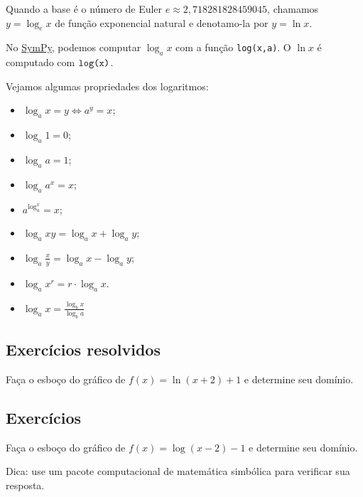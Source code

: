 \begin{obs}
  Quando a base é o número de Euler $e \approx 2,718281828459045$, chamamos $y = \log_e x$ de função exponencial natural e denotamo-la por $y = \ln x$.

  \ifispython
  No \href{https://www.sympy.org}{SymPy}, podemos computar $\log_a x$ com a função \verb+log(x,a)+. O $\ln x$ é computado com $\verb+log(x)+$.
  \fi
\end{obs}

\begin{obs}
  Vejamos algumas propriedades dos logaritmos:
  \begin{itemize}
  \item $\displaystyle \log_a x = y \Leftrightarrow a^y = x$;
  \item $\displaystyle \log_a 1 = 0$;
  \item $\displaystyle \log_a a = 1$;
  \item $\displaystyle \log_a a^x = x$;
  \item $\displaystyle a^{\log_a^x} = x$;
  \item $\displaystyle \log_a xy = \log_a x + \log_a y$;
  \item $\displaystyle \log_a \frac{x}{y} = \log_a x - \log_a y$;
  \item $\displaystyle \log_a x^r = r\cdot\log_a x$.
  \item $\displaystyle \log_a x = \frac{\log_b x}{\log_b a}$
  \end{itemize}
\end{obs}

\subsection*{Exercícios resolvidos}

\begin{exeresol}
  Faça o esboço do gráfico de $f(x) = \ln(x+2)+1$ e determine seu domínio.
\end{exeresol}
\begin{resol}
  \emconstrucao
\end{resol}

\subsection*{Exercícios}

\begin{exer}
  Faça o esboço do gráfico de $f(x) = \log(x-2)-1$ e determine seu domínio.
\end{exer}
\begin{resp}
  Dica: use um pacote computacional de matemática simbólica para verificar sua resposta.
\end{resp}
